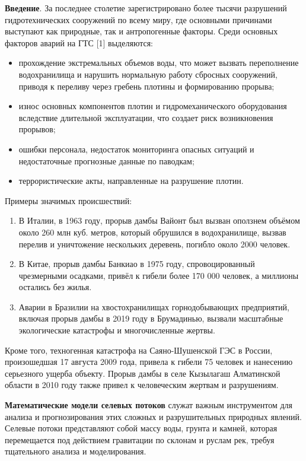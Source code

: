 \begin{multicols}{2}
{\bfseries Введение}. За последнее столетие зарегистрировано более тысячи
разрушений гидротехнических сооружений по всему миру, где основными
причинами выступают как природные, так и антропогенные факторы. Среди
основных факторов аварий на ГТС {[}1{]} выделяются:

\begin{itemize}
\item
  прохождение экстремальных объемов воды, что может вызвать переполнение
  водохранилища и нарушить нормальную работу сбросных сооружений,
  приводя к переливу через гребень плотины и формированию прорыва;
\item
  износ основных компонентов плотин и гидромеханического оборудования
  вследствие длительной эксплуатации, что создает риск возникновения
  прорывов;
\item
  ошибки персонала, недостаток мониторинга опасных ситуаций и
  недостаточные прогнозные данные по паводкам;
\item
  террористические акты, направленные на разрушение плотин.
\end{itemize}

Примеры значимых происшествий:

\begin{enumerate}
\def\labelenumi{\arabic{enumi}.}
\item
  В Италии, в 1963 году, прорыв дамбы Вайонт был вызван оползнем объёмом
  около 260 млн куб. метров, который обрушился в водохранилище, вызвав
  перелив и уничтожение нескольких деревень, погибло около 2000 человек.
\item
  В Китае, прорыв дамбы Банкиао в 1975 году, спровоцированный
  чрезмерными осадками, привёл к гибели более 170 000 человек, а
  миллионы остались без жилья.
\item
  Аварии в Бразилии на хвостохранилищах горнодобывающих предприятий,
  включая прорыв дамбы в 2019 году в Брумадинью, вызвали масштабные
  экологические катастрофы и многочисленные жертвы.
\end{enumerate}

Кроме того, техногенная катастрофа на Саяно-Шушенской ГЭС в России,
произошедшая 17 августа 2009 года, привела к гибели 75 человек и
нанесению серьезного ущерба объекту. Прорыв дамбы в селе Кызылагаш
Алматинской области в 2010 году также привел к человеческим жертвам и
разрушениям.

{\bfseries Математические модели селевых потоков} служат важным
инструментом для анализа и прогнозирования этих сложных и разрушительных
природных явлений. Селевые потоки представляют собой массу воды, грунта
и камней, которая перемещается под действием гравитации по склонам и
руслам рек, требуя тщательного анализа и моделирования.


\end{multicols}
